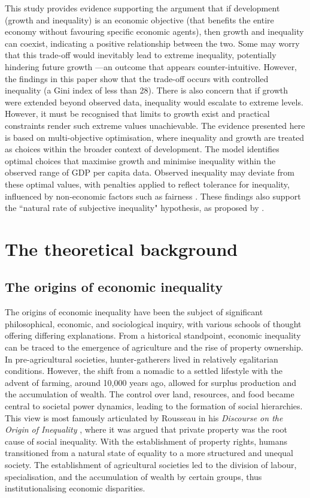 \documentclass[12pt]{article}
\begin{document}
This study provides evidence supporting the argument that if development (growth and inequality) is an economic objective (that benefits the entire economy without favouring specific economic agents), then growth and inequality can coexist, indicating a positive relationship between the two. Some may worry that this trade-off would inevitably lead to extreme inequality, potentially hindering future growth \parencite{berg2017inequality}—an outcome that appears counter-intuitive. However, the findings in this paper show that the trade-off occurs with controlled inequality (a Gini index of less than 28). There is also concern that if growth were extended beyond observed data, inequality would escalate to extreme levels. However, it must be recognised that limits to growth \parencite{meadows2018limits} exist and practical constraints render such extreme values unachievable. The evidence presented here is based on multi-objective optimisation, where inequality and growth are treated as choices within the broader context of development. The model identifies optimal choices that maximise growth and minimise inequality within the observed range of GDP per capita data. Observed inequality may deviate from these optimal values, with penalties applied to reflect tolerance for inequality, influenced by non-economic factors such as fairness \parencite{cojocaru2014fairness}. These findings also support the ``natural rate of subjective inequality" hypothesis, as proposed by \textcite{lambert2003inequality}. 

\section{The theoretical background}
\subsection{The origins of economic inequality}

The origins of economic inequality have been the subject of significant philosophical, economic, and sociological inquiry, with various schools of thought offering differing explanations. From a historical standpoint, economic inequality can be traced to the emergence of agriculture and the rise of property ownership. In pre-agricultural societies, hunter-gatherers lived in relatively egalitarian conditions. However, the shift from a nomadic to a settled lifestyle with the advent of farming, around 10,000 years ago, allowed for surplus production and the accumulation of wealth. The control over land, resources, and food became central to societal power dynamics, leading to the formation of social hierarchies. This view is most famously articulated by Rousseau in his \textit{Discourse on the Origin of Inequality} \parencite*{rousseau1755}, where it was argued that private property was the root cause of social inequality. With the establishment of property rights, humans transitioned from a natural state of equality to a more structured and unequal society. The establishment of agricultural societies led to the division of labour, specialisation, and the accumulation of wealth by certain groups, thus institutionalising economic disparities.
\end{document}
